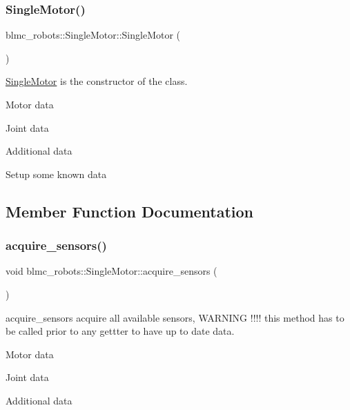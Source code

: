 \subsubsection{\texorpdfstring{Single\+Motor()}{SingleMotor()}}
{\footnotesize\ttfamily blmc\+\_\+robots\+::\+Single\+Motor\+::\+Single\+Motor (\begin{DoxyParamCaption}{ }\end{DoxyParamCaption})}



\hyperlink{classblmc__robots_1_1SingleMotor}{Single\+Motor} is the constructor of the class. 

Motor data

Joint data

Additional data

Setup some known data

\subsection{Member Function Documentation}
\mbox{\label{classblmc__robots_1_1SingleMotor_adbc3fb18b62ee085ff2d4d6bb2f107a4}} 
\subsubsection{\texorpdfstring{acquire\+\_\+sensors()}{acquire\_sensors()}}
{\footnotesize\ttfamily void blmc\+\_\+robots\+::\+Single\+Motor\+::acquire\+\_\+sensors (\begin{DoxyParamCaption}{ }\end{DoxyParamCaption})}



acquire\+\_\+sensors acquire all available sensors, W\+A\+R\+N\+I\+NG !!!! this method has to be called prior to any gettter to have up to date data. 

Motor data

Joint data

Additional data\mbox{\label{classblmc__robots_1_1SingleMotor_ab73b8091a40e846a1b6c08ac1d8e0db8}} 
